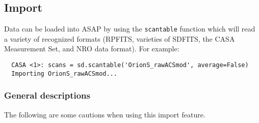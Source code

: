 \subsection{Import}
\label{subsection:sd.asap.import}

Data can be loaded into ASAP by using the {\tt scantable} function
which will read a variety of recognized formats (RPFITS, varieties of
SDFITS, the CASA Measurement Set, and NRO data format). For example:


\small
\begin{verbatim}
  CASA <1>: scans = sd.scantable('OrionS_rawACSmod', average=False)
  Importing OrionS_rawACSmod...
\end{verbatim}
\normalsize

\subsubsection{General descriptions}
\label{subsubsection:sd.asap.import.gen}

The following are some cautions when using this import feature.

